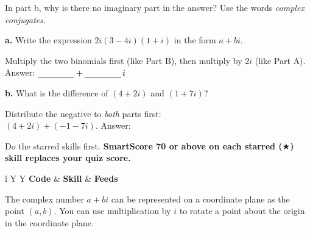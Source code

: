 \vspace{4pt}
In part b, why is there no imaginary part in the answer? Use the words \emph{complex conjugates}.\lines[2]

\begin{minipage}[t]{0.48\textwidth}
\textbf{a.} Write the expression $2i(3-4i)(1+i)$ in the form $a+bi$.

\small Multiply the two binomials first (like Part B), then multiply by $2i$ (like Part A).\normalsize
\lines[7]
\vspace{4pt}
Answer: $\blank[1.5cm]+\blank[1.5cm]\,i$
\end{minipage}\hfill
\begin{minipage}[t]{0.48\textwidth}
\textbf{b.} What is the difference of $(4+2i)$ and $(1+7i)$?

\small Distribute the negative to \emph{both} parts first:\\ $(4+2i)+(-1-7i)$.\normalsize
\lines[7]
\vspace{4pt}
Answer: \blank[4cm]
\end{minipage}

\newpage
{}
Do the starred skills first. \textbf{SmartScore 70 or above on each starred ($\bigstar$) skill replaces your quiz score.}

\vspace{2pt}
\begin{tabularx}{\textwidth}{l Y Y}
\toprule
\textbf{Code} & \textbf{Skill} & \textbf{Feeds} \\
\midrule
{}
\bottomrule
\end{tabularx}

The complex number $a+bi$ can be represented on a coordinate plane as the point $(a,b)$. You can use multiplication by $i$ to rotate a point about the origin in the coordinate plane.

